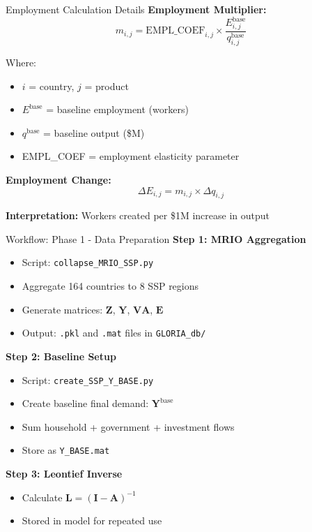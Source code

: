 \documentclass[10pt]{beamer}
\begin{document}
\begin{frame}{Employment Calculation Details}
\textbf{Employment Multiplier:}
\[
m_{i,j} = \text{EMPL\_COEF}_{i,j} \times \frac{E^{\text{base}}_{i,j}}{q^{\text{base}}_{i,j}}
\]

Where:
\begin{itemize}
    \item $i$ = country, $j$ = product
    \item $E^{\text{base}}$ = baseline employment (workers)
    \item $q^{\text{base}}$ = baseline output (\$M)
    \item EMPL\_COEF = employment elasticity parameter
\end{itemize}

\vspace{0.5cm}

\textbf{Employment Change:}
\[
\Delta E_{i,j} = m_{i,j} \times \Delta q_{i,j}
\]

\vspace{0.3cm}

\textbf{Interpretation:} Workers created per \$1M increase in output
\end{frame}


\begin{frame}{Workflow: Phase 1 - Data Preparation}
\textbf{Step 1: MRIO Aggregation}
\begin{itemize}
    \item Script: \texttt{collapse\_MRIO\_SSP.py}
    \item Aggregate 164 countries to 8 SSP regions
    \item Generate matrices: $\mathbf{Z}$, $\mathbf{Y}$, $\mathbf{VA}$, $\mathbf{E}$
    \item Output: \texttt{.pkl} and \texttt{.mat} files in \texttt{GLORIA\_db/}
\end{itemize}

\vspace{0.3cm}

\textbf{Step 2: Baseline Setup}
\begin{itemize}
    \item Script: \texttt{create\_SSP\_Y\_BASE.py}
    \item Create baseline final demand: $\mathbf{Y}^{\text{base}}$
    \item Sum household + government + investment flows
    \item Store as \texttt{Y\_BASE.mat}
\end{itemize}

\vspace{0.3cm}

\textbf{Step 3: Leontief Inverse}
\begin{itemize}
    \item Calculate $\mathbf{L} = (\mathbf{I} - \mathbf{A})^{-1}$
    \item Stored in model for repeated use
\end{itemize}
\end{frame}
\end{document}
